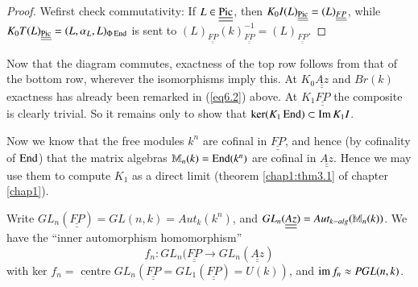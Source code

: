 \begin{proof}
We\pageoriginale first check commutativity: If $L
\in\underline{\underline{\operatorname{Pic}}}$, 
then $K_0 I (L)_{\underline{\underline{\operatorname{Pic}}}} =
(L)_{\underline{\underline{FP}}}$, while $K_0 T(L)_{
  \underline{\underline{\operatorname{Pic}}}} = (L, \alpha_L, L)_{\Phi \operatorname{End} }$ is sent
to $(L)_{\underline{\underline{FP}}}
(k)^{-1}_{\underline{\underline{FP}}} =
(L)_{\underline{\underline{FP}}}$.  
\end{proof}

Now that the diagram commutes, exactness of the top row follows from that of
the bottom row, wherever the isomorphisms imply this. At $K_0
\underline{\underline{Az}}$ and $Br (k)$ exactness has already been
remarked in (\ref{eq6.2}) above. At $K_1 \underline{\underline{FP}}$ the
composite is clearly trivial. So it remains only to show that $\ker(K_1
\operatorname{End}) \subset \operatorname{Im} K_1 I$.  

Now we know that the free modules $k^n$ are cofinal in
$\underline{\underline{FP}}$, and hence (by cofinality of $\operatorname{End}$) that
the matrix algebras $\mathbb{M}_n (k) = \operatorname{End}(k^n)$ are cofinal in
$\underline{\underline{Az}}$. Hence we may use them to compute $K_1$
as a direct limit (theorem \ref{chap1:thm3.1} of chapter \ref{chap1}).  
  
Write $GL_n (\underline{\underline{FP}}) = GL(n, k) = Aut_k (k^n)$,
and $GL_n(\underline{\underline{Az}}) = Aut _{ k -alg}\break (\mathbb{M}_n
(k))$. We have the ``inner automorphism homomorphism''  
$$
f_n : GL_n (\underline{\underline{FP}} \to GL_n
(\underline{\underline{Az}}) 
$$
with ker $f_n = $ centre $GL_n (\underline{\underline{FP}} = GL_1
(\underline{\underline{FP}}) = U(k))$, and $\im f_n \approx PGL\break (n,
k)$.  

